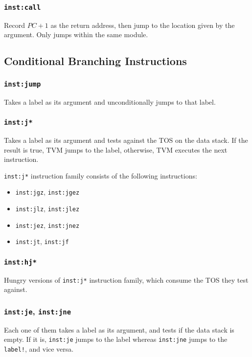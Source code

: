 \documentclass{article}
\newcommand{\inst}[1] {\texttt{inst:#1}}
\begin{document}
\subsubsection{\inst{call}}

Record $PC + 1$ as the return address, then jump to the location given by the argument. Only jumps within the same module.

\subsection{Conditional Branching Instructions}

\subsubsection{\inst{jump}}

Takes a label as its argument and unconditionally jumps to that label.

\subsubsection{\inst{j*}}

Takes a label as its argument and tests against the TOS on the data stack. If the result is true, TVM jumps to the label, otherwise, TVM executes the next instruction.

\inst{j*} instruction family consists of the following instructions:
\begin{itemize}
\item \inst{jgz}, \inst{jgez}
\item \inst{jlz}, \inst{jlez}
\item \inst{jez}, \inst{jnez}
\item \inst{jt}, \inst{jf}
\end{itemize}

\subsubsection{\inst{hj*}}

Hungry versions of \inst{j*} instruction family, which consume the TOS they test against.

\subsubsection{\inst{je}, \inst{jne}}

Each one of them takes a label as its argument, and tests if the data stack is empty. If it is, \inst{je} jumps to the label whereas \inst{jne} jumps to the \texttt{label!}, and vice versa.
\end{document}
